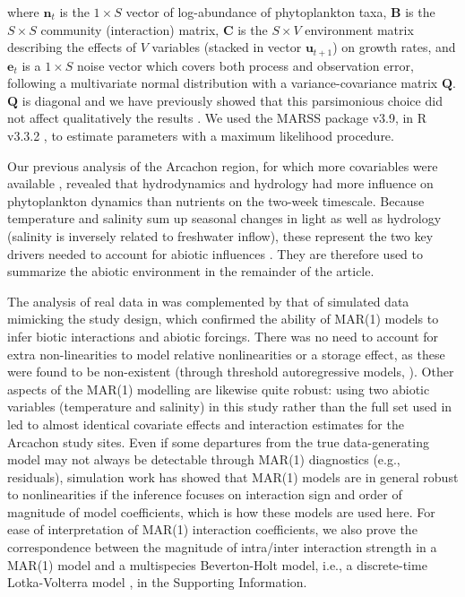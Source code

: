 \documentclass[10pt]{article}
\begin{document}
where $\mathbf{n}_{\ensuremath{t}}$ is the $1\times S$ vector of
log-abundance of phytoplankton taxa, $\mathbf{B}$ is the $S\times S$
community (interaction) matrix, $\mathbf{C}$ is the $S\times V$
environment matrix describing the effects of $V$ variables (stacked
in vector $\mathbf{u}_{t+1}$) on growth
rates, and $\mathbf{e}_{t}$ is a $1\times S$ noise vector which
covers both process and observation error, following a multivariate
normal distribution with a variance-covariance matrix $\mathbf{Q}$.
$\mathbf{Q}$ is diagonal and we have previously showed that this
parsimonious choice did not affect qualitatively the results \citep{barraquand_coastal_2018}. We used the MARSS package \citep{holmes_analysis_2014} v3.9, in R
v3.3.2 \citep{venables_r_2013}, to estimate parameters with a maximum
likelihood procedure.

Our previous analysis of the Arcachon region, for which more covariables were available \citep{barraquand_coastal_2018},
revealed that hydrodynamics and hydrology had more influence on phytoplankton dynamics than nutrients on the two-week timescale.
Because temperature and salinity sum up seasonal changes in light as well as hydrology (salinity is inversely related to freshwater
inflow), these represent the two key drivers needed to account for abiotic influences \citep{scheef_inferring_2013}.
They are therefore used to summarize the abiotic environment in the remainder of the article. 

The analysis of real data in \citet{barraquand_coastal_2018} was complemented by
that of simulated data mimicking the study design, which confirmed
the ability of MAR(1) models to infer biotic interactions and abiotic
forcings. There was no need to account for extra non-linearities to
model relative nonlinearities or a storage effect, as these were found
to be non-existent (through threshold autoregressive models, \citealp{barraquand_coastal_2018}).
Other aspects of the MAR(1) modelling are likewise quite robust: using
two abiotic variables (temperature and salinity) in this study rather
than the full set used in \citet{barraquand_coastal_2018} led to
almost identical covariate effects and interaction estimates for the
Arcachon study sites. Even if some departures from the true data-generating
model may not always be detectable through MAR(1) diagnostics (e.g.,
residuals), simulation work has showed that MAR(1) models are in general
robust to nonlinearities \citep{certain_how_2018} if the inference
focuses on interaction sign and order of magnitude of model coefficients,
which is how these models are used here. For
ease of interpretation of MAR(1) interaction coefficients, we also
prove the correspondence between the magnitude of intra/inter interaction
strength in a MAR(1) model and a multispecies Beverton-Holt model,
i.e., a discrete-time Lotka-Volterra model \citep{cushing_discrete_2004},
in the Supporting Information.
\end{document}
